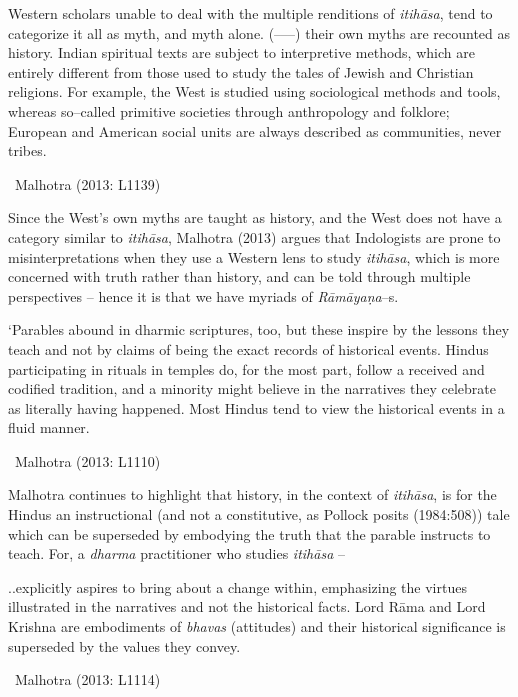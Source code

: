\begin{myquote}
Western scholars unable to deal with the multiple renditions of \textit{itihāsa}, tend to categorize it all as myth, and myth alone. (–––) their own myths are recounted as history. Indian spiritual texts are subject to interpretive methods, which are entirely different from those used to study the tales of Jewish and Christian religions. For example, the West is studied using sociological methods and tools, whereas so–called primitive societies through anthropology and folklore; European and American social units are always described as communities, never tribes.

~\hfill Malhotra (2013: L1139)
\end{myquote}

Since the West’s own myths are taught as history, and the West does not have a category similar to \textit{itihāsa}, Malhotra (2013) argues that Indologists are prone to misinterpretations when they use a Western lens to study \textit{itihāsa}, which is more concerned with truth rather than history, and can be told through multiple perspectives – hence it is that we have myriads of \textit{Rāmāyaṇa}–s.

\begin{myquote}
‘Parables abound in dharmic scriptures, too, but these inspire by the lessons they teach and not by claims of being the exact records of historical events. Hindus participating in rituals in temples do, for the most part, follow a received and codified tradition, and a minority might believe in the narratives they celebrate as literally having happened. Most Hindus tend to view the historical events in a fluid manner.

~\hfill Malhotra (2013: L1110)
\end{myquote}

Malhotra continues to highlight that history, in the context of \textit{itihāsa}, is for the Hindus an instructional (and not a constitutive, as Pollock posits (1984:508)) tale which can be superseded by embodying the truth that the parable instructs to teach. For, a \textit{dharma} practitioner who studies \textit{itihāsa} –

\begin{myquote}
..explicitly aspires to bring about a change within, emphasizing the virtues illustrated in the narratives and not the historical facts. Lord Rāma and Lord Krishna are embodiments of \textit{bhavas} (attitudes) and their historical significance is superseded by the values they convey.

~\hfill Malhotra (2013: L1114)
\end{myquote}

